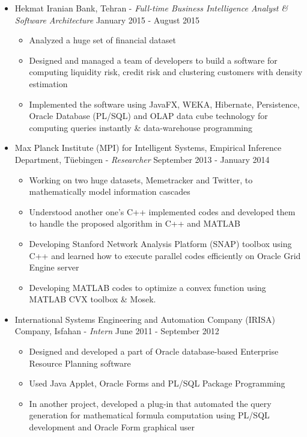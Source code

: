 \documentclass[letter]{res}
\begin{document}
\begin{resume}
\begin{itemize}
  \item Hekmat Iranian Bank, Tehran \newline
   - {\sl Full-time Business Intelligence Analyst \& Software Architecture} \hfill January 2015 - August 2015\\
  \vspace{-4mm}
  \iflong
    \begin{itemize}
        \item Analyzed a huge set of financial dataset
        \item Designed and managed a team of developers to build a software for computing liquidity risk, credit risk and clustering customers with density estimation
        \item Implemented the software using JavaFX, WEKA, Hibernate, Persistence, Oracle Database (PL/SQL) and OLAP data cube technology for computing queries instantly \& data-warehouse programming
    \end{itemize}
  \fi
  
  \item Max Planck Institute (MPI) for Intelligent Systems, Empirical Inference Department, Tüebingen \newline
  - {\sl Researcher} \hfill September 2013 - January 2014\\
    \vspace{-4mm}
    \iflong
      \begin{itemize}
          \item Working on two huge datasets, Memetracker and Twitter, to mathematically model information cascades
          \item Understood another one's C++ implemented codes and developed them to handle the proposed algorithm in C++ and MATLAB
          \item Developing Stanford Network Analysis Platform (SNAP) toolbox using C++ and learned how to execute parallel codes efficiently on Oracle Grid Engine server
          \item Developing MATLAB codes to optimize a convex function using MATLAB CVX toolbox \& Mosek.
      \end{itemize}
    \fi
  
  \item International Systems Engineering and Automation Company (IRISA) Company, Isfahan \newline
- {\sl Intern} \hfill June 2011 - September 2012\\
	\vspace{-4mm}
    \iflong
      \begin{itemize}
          \item Designed and developed a part of Oracle database-based Enterprise Resource Planning software
          \item Used Java Applet, Oracle Forms and PL/SQL Package Programming
          \item In another project, developed a plug-in that automated the query generation for mathematical formula computation using PL/SQL development and Oracle Form graphical user
      \end{itemize}
    \fi


\end{itemize}
\end{resume}
\end{document}
